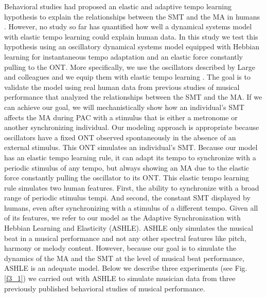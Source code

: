 \documentclass{report}
\begin{document}
Behavioral studies had proposed an elastic and adaptive tempo learning hypothesis to explain the relationships between the SMT and the MA in humans \cite{scheurich2018tapping}. However, no study so far has quantified how well a dynamical systems model with elastic tempo learning could explain human data. In this study we test this hypothesis using an oscillatory dynamical systems model equipped with Hebbian learning for instantaneous tempo adaptation and an elastic force constantly pulling to the ONT. More specifically, we use the oscillators described by Large and colleagues \cite{large2010canonical} and we equip them with elastic tempo learning \cite{righetti2009adaptive, lambert2016adaptive}. The goal is to validate the model using real human data from previous studies of musical performance that analyzed the relationships between the SMT and the MA. If we can achieve our goal, we will mechanistically show how an individual's SMT affects the MA during PAC with a stimulus that is either a metronome or another synchronizing individual. Our modeling approach is appropriate because oscillators have a fixed ONT observed spontaneously in the absence of an external stimulus. This ONT simulates an individual's SMT. Because our model has an elastic tempo learning rule, it can adapt its tempo to synchronize with a periodic stimulus of any tempo, but always showing an MA due to the elastic force constantly pulling the oscillator to its ONT. This elastic tempo learning rule simulates two human features. First, the ability to synchronize with a broad range of periodic stimulus tempi. And second, the constant SMT displayed by humans, even after synchronizing with a stimulus of a different tempo. Given all of its features, we refer to our model as the Adaptive Synchronization with Hebbian Learning and Elasticity (ASHLE). ASHLE only simulates the musical beat in a musical performance and not any other spectral features like pitch, harmony or melody content. However, because our goal is to simulate the dynamics of the MA and the SMT at the level of musical beat performance, ASHLE is an adequate model. Below we describe three experiments (see Fig.{} \ref{f3_1}) we carried out with ASHLE to simulate musician data from three previously published behavioral studies of musical performance.
\end{document}
